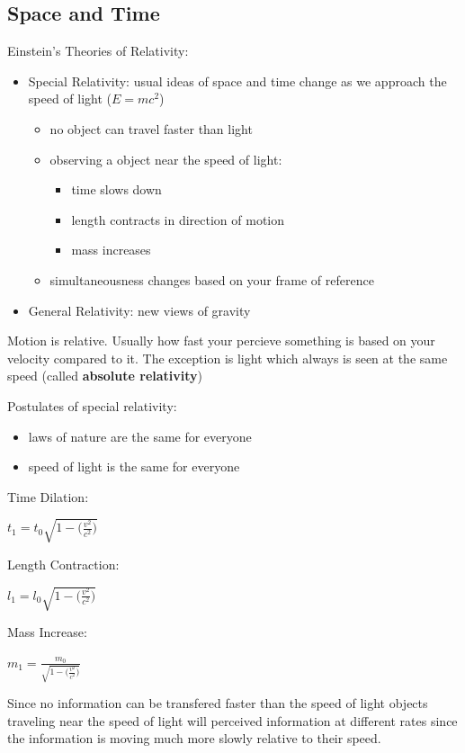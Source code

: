\documentclass[12pt]{article}
\begin{document}
\subsection{Space and Time}
Einstein's Theories of Relativity:
\begin{itemize}
    \item Special Relativity: usual ideas of space and time change as we approach the speed of light ($E = mc^2$)
    \begin{itemize}
        \item no object can travel faster than light
        \item observing a object near the speed of light:
        \begin{itemize}
            \item time slows down
            \item length contracts in direction of motion
            \item mass increases
        \end{itemize}
        \item simultaneousness changes based on your frame of reference
    \end{itemize}
    \item General Relativity: new views of gravity
\end{itemize}

Motion is relative. Usually how fast your percieve something is based on your velocity compared to it. The exception is light which always is seen at the same speed (called \textbf{absolute relativity})

Postulates of special relativity:
\begin{itemize}
    \item laws of nature are the same for everyone
    \item speed of light is the same for everyone
\end{itemize}

Time Dilation:
\begin{center}
    $t_1 = t_0\sqrt{1-\bigg(\frac{v^2}{c^2}\bigg)}$
\end{center}
Length Contraction:
\begin{center}
    $l_1 = l_0\sqrt{1-\bigg(\frac{v^2}{c^2}\bigg)}$
\end{center}
Mass Increase:
\begin{center}
    $m_1 = \frac{m_0}{\sqrt{1-\bigg(\frac{v^2}{c^2}\bigg)}}$
\end{center}
Since no information can be transfered faster than the speed of light objects traveling near the speed of light will perceived information at different rates since the information is moving much more slowly relative to their speed.
\end{document}
